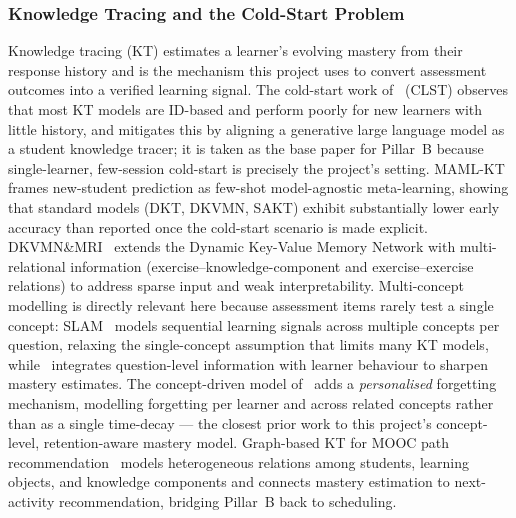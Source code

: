 \documentclass[12pt]{report}
\begin{document}
\subsubsection{Knowledge Tracing and the Cold-Start Problem}
Knowledge tracing (KT) estimates a learner's evolving mastery from their response history
and is the mechanism this project uses to convert assessment outcomes into a verified
learning signal. The cold-start work of~\cite{clst2024} (CLST) observes that most KT models
are ID-based and perform poorly for new learners with little history, and mitigates this by
aligning a generative large language model as a student knowledge tracer; it is taken as
the base paper for Pillar~B because single-learner, few-session cold-start is precisely the
project's setting. MAML-KT~\cite{maml2026} frames new-student prediction as few-shot
model-agnostic meta-learning, showing that standard models (DKT, DKVMN, SAKT) exhibit
substantially lower early accuracy than reported once the cold-start scenario is made
explicit. DKVMN\&MRI~\cite{dkvmn2024} extends the Dynamic Key-Value Memory Network with
multi-relational information (exercise--knowledge-component and exercise--exercise
relations) to address sparse input and weak interpretability. Multi-concept modelling is
directly relevant here because assessment items rarely test a single concept: SLAM~\cite{slam2026}
models sequential learning signals across multiple concepts per question, relaxing the
single-concept assumption that limits many KT models, while~\cite{su2025} integrates
question-level information with learner behaviour to sharpen mastery estimates. The
concept-driven model
of~\cite{conceptkt2026} adds a \emph{personalised} forgetting mechanism, modelling
forgetting per learner and across related concepts rather than as a single time-decay ---
the closest prior work to this project's concept-level, retention-aware mastery model.
Graph-based KT for MOOC path recommendation~\cite{graphkt2025} models heterogeneous
relations among students, learning objects, and knowledge components and connects mastery
estimation to next-activity recommendation, bridging Pillar~B back to scheduling.
\end{document}
